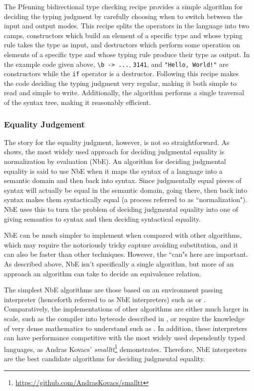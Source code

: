 \documentclass[sigplan,nonacm]{acmart}
\begin{document}
The Pfenning bidirectional type checking recipe \citep{Dunfield2021} provides a simple algorithm for deciding the typing judgment by carefully choosing when to switch between the input and output modes.
This recipe splits the operators in the language into two camps, constructors which build an element of a specific type and whose typing rule takes the type as input, and destructors which perform some operation on elements of a specific type and whose typing rule produce their type as output.
In the example code given above, \verb|\b -> ...|, \verb|3141|, and \verb|"Hello, World!"| are constructors while the \verb|if| operator is a destructor.
Following this recipe makes the code deciding the typing judgment very regular, making it both simple to read and simple to write.
Additionally, the algorithm performs a single traversal of the syntax tree, making it reasonably efficient.

\subsubsection{Equality Judgement}

The story for the equality judgment, however, is not so straightforward.
As \citet{Abel2013} shows, the most widely used approach for deciding judgmental equality is normalization by evaluation (NbE).
An algorithm for deciding judgmental equality is said to use NbE when it maps the syntax of a language into a semantic domain and then back into syntax.
Since judgmentally equal pieces of syntax will actually be equal in the semantic domain, going there, then back into syntax makes them syntactically equal (a process referred to as ``normalization").
NbE uses this to turn the problem of deciding judgmental equality into one of giving semantics to syntax and then deciding syntactical equality.

NbE can be much simpler to implement when compared with other algorithms, which may require the notoriously tricky capture avoiding substitution, and it can also be faster than other techniques.
However, the ``can"s here are important.
As described above, NbE isn't specifically a single algorithm, but more of an approach an algorithm can take to decide an equivalence relation.

The simplest NbE algorithms are those based on an environment passing interpreter (henceforth referred to as NbE interpreters) such as \citet{Coquand1996} or \citet{Chapman2005}.
Comparatively, the implementations of other algorithms are either much larger in scale, such as the compiler into bytecode described in \citet{Grgoire2002}, or require the knowledge of very dense mathematics to understand such as \citet{Ahman2013}.
In addition, these interpreters can have performance competitive with the most widely used dependently typed languages, as Andras Kovacs' \textit{smalltt}\footnote{\url{https://github.com/AndrasKovacs/smalltt}} demonstrates.
Therefore, NbE interpreters are the best candidate algorithms for deciding judgmental equality.
\end{document}
